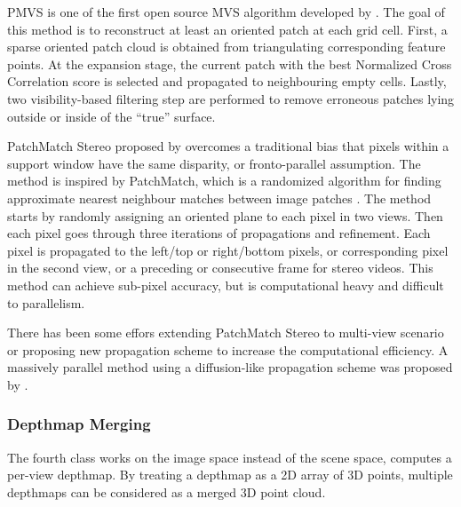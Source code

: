 PMVS is one of the first open source MVS algorithm developed by \citeauthor{furukawa2010accurate}. The goal of this method is to reconstruct at least an oriented patch at each grid cell. First, a sparse oriented patch cloud is obtained from triangulating corresponding feature points. At the expansion stage, the current patch with the best Normalized Cross Correlation score is selected and propagated to neighbouring empty cells. Lastly, two visibility-based filtering step are performed to remove erroneous patches lying outside or inside of the ``true'' surface.

PatchMatch Stereo proposed by \citeauthor{bleyer2011patchmatch} overcomes a traditional bias that pixels within a support window have the same disparity, or fronto-parallel assumption. The method is inspired by PatchMatch, which is a randomized algorithm for finding approximate nearest neighbour matches between image patches \cite{Barnes:2009:PAR}. The method starts by randomly assigning an oriented plane to each pixel in two views. Then each pixel goes through three iterations of propagations and refinement. Each pixel is propagated to the left/top or right/bottom pixels, or corresponding pixel in the second view, or a preceding or consecutive frame for stereo videos. This method can achieve sub-pixel accuracy, but is computational heavy and difficult to parallelism.

There has been some effors extending PatchMatch Stereo to multi-view scenario or proposing new propagation scheme to increase the computational efficiency. A massively parallel method using a diffusion-like propagation scheme was proposed by \citeauthor{galliani2015massively}.


\subsubsection{Depthmap Merging}
The fourth class works on the image space instead of the scene space, computes a per-view depthmap. By treating a depthmap as a 2D array of 3D points, multiple depthmaps can be considered as a merged 3D point cloud.

